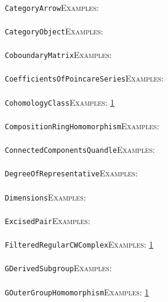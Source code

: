 \documentclass[a4paper,11pt]{report}
\begin{document}
{{ \\
 \texttt{CategoryArrow}{\nobreakspace}{\nobreakspace}{\nobreakspace}{\nobreakspace}\textsc{Examples:} \\
 \\
 \texttt{CategoryObject}{\nobreakspace}{\nobreakspace}{\nobreakspace}{\nobreakspace}\textsc{Examples:} \\
 \\
 \texttt{CoboundaryMatrix}{\nobreakspace}{\nobreakspace}{\nobreakspace}{\nobreakspace}\textsc{Examples:} \\
 \\
 \texttt{CoefficientsOfPoincareSeries}{\nobreakspace}{\nobreakspace}{\nobreakspace}{\nobreakspace}\textsc{Examples:} \\
 \\
 \texttt{CohomologyClass}{\nobreakspace}{\nobreakspace}{\nobreakspace}{\nobreakspace}\textsc{Examples:} \href{../www/SideLinks/About/aboutGouter.html} {1}{\nobreakspace} \\
 \\
 \texttt{CompositionRingHomomorphism}{\nobreakspace}{\nobreakspace}{\nobreakspace}{\nobreakspace}\textsc{Examples:} \\
 \\
 \texttt{ConnectedComponentsQuandle}{\nobreakspace}{\nobreakspace}{\nobreakspace}{\nobreakspace}\textsc{Examples:} \\
 \\
 \texttt{DegreeOfRepresentative}{\nobreakspace}{\nobreakspace}{\nobreakspace}{\nobreakspace}\textsc{Examples:} \\
 \\
 \texttt{Dimensions}{\nobreakspace}{\nobreakspace}{\nobreakspace}{\nobreakspace}\textsc{Examples:} \\
 \\
 \texttt{ExcisedPair}{\nobreakspace}{\nobreakspace}{\nobreakspace}{\nobreakspace}\textsc{Examples:} \\
 \\
 \texttt{FilteredRegularCWComplex}{\nobreakspace}{\nobreakspace}{\nobreakspace}{\nobreakspace}\textsc{Examples:} \href{tutorial/chap4.html} {1}{\nobreakspace} \\
 \\
 \texttt{GDerivedSubgroup}{\nobreakspace}{\nobreakspace}{\nobreakspace}{\nobreakspace}\textsc{Examples:} \\
 \\
 \texttt{GOuterGroupHomomorphism}{\nobreakspace}{\nobreakspace}{\nobreakspace}{\nobreakspace}\textsc{Examples:} \href{../www/SideLinks/About/aboutCoefficientSequence.html} {1}{\nobreakspace} \\
}}
\end{document}
